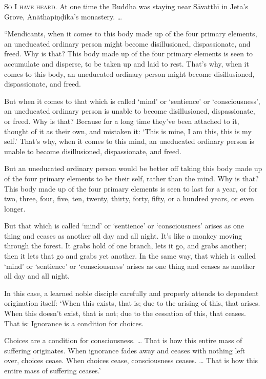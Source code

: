 \documentclass[12pt,openany]{book}%
\newcommand*{\scevam}[1]{\textsc{#1}}
\begin{document}
\scevam{So I have heard. }At one time the Buddha was staying near \textsanskrit{Sāvatthī} in Jeta’s Grove, \textsanskrit{Anāthapiṇḍika}’s monastery. … 

“Mendicants, when it comes to this body made up of the four primary elements, an uneducated ordinary person might become disillusioned, dispassionate, and freed. Why is that? This body made up of the four primary elements is seen to accumulate and disperse, to be taken up and laid to rest. That’s why, when it comes to this body, an uneducated ordinary person might become disillusioned, dispassionate, and freed. 

But when it comes to that which is called ‘mind’ or ‘sentience’ or ‘consciousness’, an uneducated ordinary person is unable to become disillusioned, dispassionate, or freed. Why is that? Because for a long time they’ve been attached to it, thought of it as their own, and mistaken it: ‘This is mine, I am this, this is my self.’ That’s why, when it comes to this mind, an uneducated ordinary person is unable to become disillusioned, dispassionate, and freed. 

But an uneducated ordinary person would be better off taking this body made up of the four primary elements to be their self, rather than the mind. Why is that? This body made up of the four primary elements is seen to last for a year, or for two, three, four, five, ten, twenty, thirty, forty, fifty, or a hundred years, or even longer. 

But that which is called ‘mind’ or ‘sentience’ or ‘consciousness’ arises as one thing and ceases as another all day and all night. It’s like a monkey moving through the forest. It grabs hold of one branch, lets it go, and grabs another; then it lets that go and grabs yet another. In the same way, that which is called ‘mind’ or ‘sentience’ or ‘consciousness’ arises as one thing and ceases as another all day and all night. 

In this case, a learned noble disciple carefully and properly attends to dependent origination itself: ‘When this exists, that is; due to the arising of this, that arises. When this doesn’t exist, that is not; due to the cessation of this, that ceases. That is: Ignorance is a condition for choices. 

Choices are a condition for consciousness. … That is how this entire mass of suffering originates. When ignorance fades away and ceases with nothing left over, choices cease. When choices cease, consciousness ceases. … That is how this entire mass of suffering ceases.’ 
\end{document}

